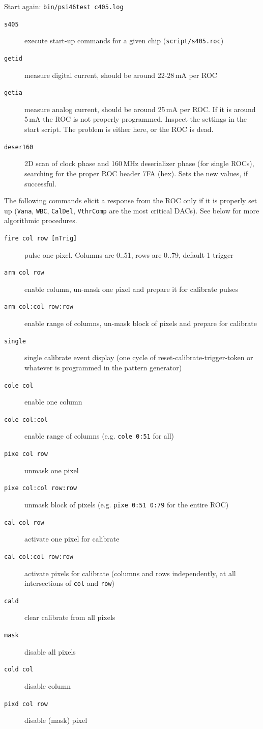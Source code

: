 \documentclass[english]{article}
\begin{document}
Start again: \texttt{bin/psi46test c405.log} 
\begin{description}
\item [\texttt{s405}] execute start-up commands for a given chip
(\texttt{script/s405.roc}) 
\item [\texttt{getid}] measure digital current, should be around
22-28\,mA per ROC 
\item [\texttt{getia}] measure analog current, should be around 25\,mA per ROC.
If it is around 5\,mA the ROC is not properly programmed.
Inspect the settings in the start script.
The problem is either here, or the ROC is dead. 
\item [\texttt{deser160}] 2D scan of clock phase and 160\,MHz
deserializer phase (for single ROCs), searching for the proper ROC
header 7FA (hex). Sets the new values, if successful. 
\end{description}
The following commands elicit a response from the ROC only if it is
properly set up (\texttt{Vana}, \texttt{WBC}, \texttt{CalDel}, \texttt{VthrComp}
are the most critical DACs). See below for more algorithmic procedures. 
\begin{description}
\item [\texttt{fire\ col\ row\ {[}nTrig{]}}] pulse one pixel.
Columns are 0..51, rows are 0..79, default 1 trigger 
\item [\texttt{arm\ col\ row}] enable column, un-mask one pixel
and prepare it for calibrate pulses 
\item [\texttt{arm\ col:col\ row:row}] enable range of columns,
un-mask block of pixels and prepare for calibrate 
\item [\texttt{single}] single calibrate event display (one cycle
of reset-calibrate-trigger-token or whatever is programmed in the
pattern generator) 
\item [\texttt{cole\ col}] enable one column 
\item [\texttt{cole\ col:col}] enable range of columns (e.g.
\texttt{cole 0:51} for all) 
\item [\texttt{pixe\ col\ row}] unmask one pixel 
\item [\texttt{pixe\ col:col\ row:row}] unmask block of pixels
(e.g. \texttt{pixe 0:51 0:79} for the entire ROC) 
\item [\texttt{cal\ col\ row}] activate one pixel for calibrate 
\item [\texttt{cal\ col:col\ row:row}] activate pixels for calibrate
(columns and rows independently, at all intersections of
\texttt{col} and \texttt{row}) 
\item [\texttt{cald}] clear calibrate from all pixels 
\item [\texttt{mask}] disable all pixels 
\item [\texttt{cold\ col}] disable column 
\item [\texttt{pixd\ col\ row}] disable (mask) pixel 
\end{description}
\end{document}
